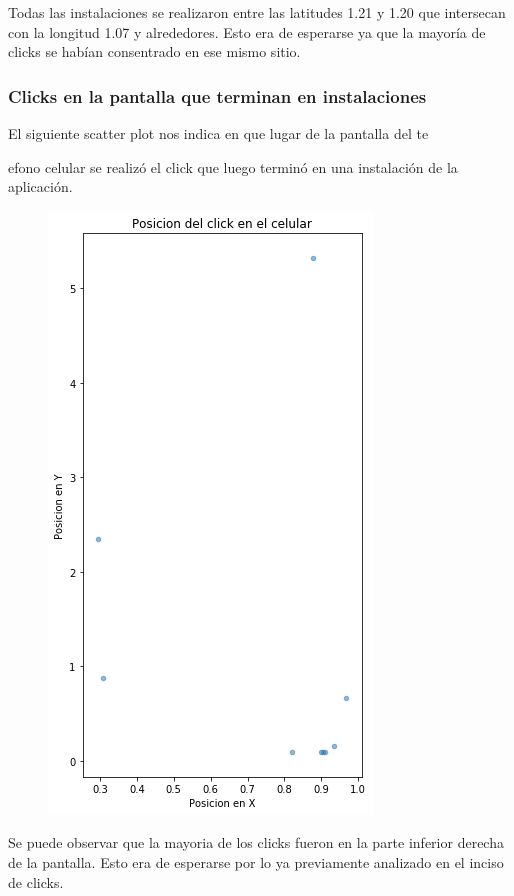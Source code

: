 \documentclass[a4paper, 12pt]{article}
\newcommand\tab[1][1cm]{\hspace*{#1}}
\begin{document}
{	\tab Todas las instalaciones se realizaron entre las latitudes 1.21 y 1.20 que intersecan con la longitud 1.07 y alrededores. Esto era de esperarse ya que la mayoría de clicks se habían consentrado en ese mismo sitio.
	
	\clearpage
	\subsubsection{Clicks en la pantalla que terminan en instalaciones}
	\tab  El siguiente scatter plot nos indica en que lugar de la pantalla del te{efono celular se realizó el click que luego terminó en una instalación de la aplicación.
	
	\FloatBarrier
		\begin{figure}[h]
			\centering
			\includegraphics[scale = 0.5]{images/clicks-installs/touch_pos.png}
			\caption{}
		\end{figure}
	\FloatBarrier
	
	\tab Se puede observar que la mayoria de los clicks fueron en la parte inferior derecha de la pantalla. Esto era de esperarse por lo ya previamente analizado en el inciso de clicks.
	
}}
\end{document}
